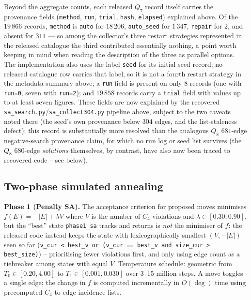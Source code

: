 \documentclass[12pt]{article}
\begin{document}
Beyond the aggregate counts, each released $Q_7$ record itself carries
the provenance fields (\texttt{method}, \texttt{run},
\texttt{trial}, \texttt{hash}, \texttt{elapsed}) explained above. Of
the $19\,866$ records, \texttt{method} is \texttt{auto} for $18\,206$,
\texttt{auto\_seed} for $1\,347$, \texttt{repair} for $2$, and absent
for $311$ --- so among the collector's three restart strategies represented in the
released catalogue the third contributed essentially nothing, a point worth
keeping in mind when reading the description of the three as parallel
options. The implementation also uses the label \texttt{seed} for its initial
seed record; no released catalogue row carries that label, so it is not a
fourth restart strategy in the metadata summary above; a \texttt{run} field is present on only $8$ records (one
with \texttt{run=0}, seven with \texttt{run=2}); and $19\,858$ records
carry a \texttt{trial} field with values up to at least seven figures.
These fields are now explained by the recovered
\texttt{sa\_search.py}/\texttt{sa\_collect304.py} pipeline above,
subject to the two caveats noted there (the seed's own provenance
below $304$ edges, and the list-staleness defect); this record is
substantially more resolved than the analogous $Q_8$ $681$-edge
negative-search provenance claim, for which no run log or seed list survives (the $Q_8$ $680$-edge \emph{solutions}
themselves, by contrast, have also now been traced to recovered code
-- see below).

\subsection{Two-phase simulated annealing}

\noindent\textbf{Phase 1 (Penalty SA).}
The acceptance criterion for proposed moves minimises
$f(E)=-|E|+\lambda V$ where $V$ is the number of $C_4$ violations
and $\lambda\in[0.30,0.90]$, but the ``best'' state \texttt{phase1\_sa}
tracks and returns is \emph{not} the minimiser of $f$: the released
code instead keeps the state with lexicographically smallest $(V,-|E|)$
seen so far (\texttt{v\_cur < best\_v or (v\_cur == best\_v and
size\_cur > best\_size)}) -- prioritising fewer violations first, and
only using edge count as a tiebreaker among states with equal $V$.
Temperature schedule: geometric from $T_0\in[0.20,4.00]$ to
$T_1\in[0.001,0.030]$ over $3$--$15$ million steps.
A move toggles a single edge; the change in $f$ is computed incrementally
in $O(\deg)$ time using precomputed $C_4$-to-edge incidence lists.
\end{document}
